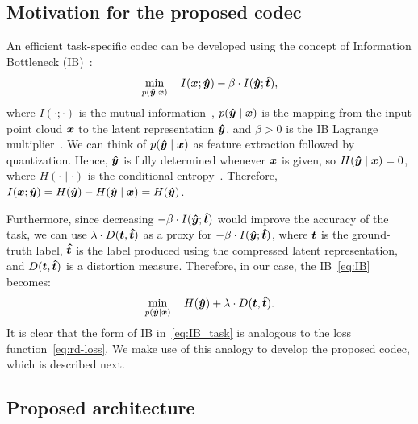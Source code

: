 \subsection{Motivation for the proposed codec}

An efficient task-specific codec can be developed using the concept of Information Bottleneck (IB)~\cite{IB_Allerton1999}:
\begin{equation}
  \min_{p({\boldsymbol{\hat{y}}} \mid {\boldsymbol{x}})} \quad I({\boldsymbol{x}}; {\boldsymbol{\hat{y}}}) - \beta \cdot I({\boldsymbol{\hat{y}}} ; {\boldsymbol{\hat{t}}}),
\label{eq:IB}
\end{equation}
where $I(\cdot;\cdot)$ is the mutual information~\cite{Cover_Thomas_2006}, $p({\boldsymbol{\hat{y}}} \mid {\boldsymbol{x}})$ is the mapping from the input point cloud ${\boldsymbol{x}}$ to the latent representation ${\boldsymbol{\hat{y}}}$, and $\beta>0$ is the IB Lagrange multiplier~\cite{IB_Allerton1999}.
We can think of $p({\boldsymbol{\hat{y}}} \mid {\boldsymbol{x}})$ as feature extraction followed by quantization.
Hence, ${\boldsymbol{\hat{y}}}$ is fully determined whenever ${\boldsymbol{x}}$ is given, so $H({\boldsymbol{\hat{y}}} \mid {\boldsymbol{x}}) = 0$, where $H(\cdot \mid \cdot)$ is the conditional entropy~\cite{Cover_Thomas_2006}.
Therefore, $I({\boldsymbol{x}}; {\boldsymbol{\hat{y}}}) = H({\boldsymbol{\hat{y}}}) - H({\boldsymbol{\hat{y}}} \mid {\boldsymbol{x}}) = H({\boldsymbol{\hat{y}}})$.

Furthermore, since decreasing $-\beta\cdot I({\boldsymbol{\hat{y}}} ; {\boldsymbol{\hat{t}}})$ would improve the accuracy of the task, we can use $\lambda \cdot D({\boldsymbol{t}},{\boldsymbol{\hat{t}}})$ as a proxy for $-\beta\cdot I({\boldsymbol{\hat{y}}} ; {\boldsymbol{\hat{t}}})$, where ${\boldsymbol{t}}$ is the ground-truth label, ${\boldsymbol{\hat{t}}}$ is the label produced using the compressed latent representation, and $D({\boldsymbol{t}},{\boldsymbol{\hat{t}}})$ is a distortion measure.
Therefore, in our case, the IB~\eqref{eq:IB} becomes:
\begin{equation}
  \min_{p({\boldsymbol{\hat{y}}} \mid {\boldsymbol{x}})} \quad H({\boldsymbol{\hat{y}}}) + \lambda \cdot D({\boldsymbol{t}},{\boldsymbol{\hat{t}}}).
\label{eq:IB_task}
\end{equation}
It is clear that the form of IB in~\eqref{eq:IB_task} is analogous to the loss function~\eqref{eq:rd-loss}.
We make use of this analogy to develop the proposed codec, which is described next.



\subsection{Proposed architecture}

